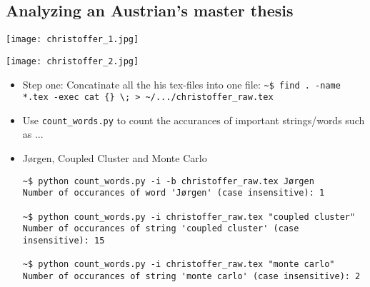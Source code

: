 \documentclass{beamer}
\begin{document}
\subsection{Analyzing an Austrian's master thesis}

\begin{frame}
\begin{center}
 \texttt{[image: christoffer\_1.jpg]}
\end{center}
\end{frame}

\begin{frame}
\begin{center}
 \texttt{[image: christoffer\_2.jpg]}
\end{center}
\end{frame}




\begin{frame}[containsverbatim]
\begin{itemize}
 \item Step one: Concatinate all the his tex-files into one file:  
 \vspace{0.2cm}
\scriptsize
\verb+~$ find . -name *.tex -exec cat {} \; > ~/.../christoffer_raw.tex+
\normalsize

 \item Use \verb+count_words.py+ to count the accurances of important strings/words such as ...

\end{itemize}
\end{frame}

\begin{frame}[containsverbatim]
\begin{itemize}

 \item Jørgen, Coupled Cluster and Monte Carlo
 \vspace{0.2cm}
\scriptsize
\begin{verbatim}
~$ python count_words.py -i -b christoffer_raw.tex Jørgen
Number of occurances of word 'Jørgen' (case insensitive): 1

~$ python count_words.py -i christoffer_raw.tex "coupled cluster"
Number of occurances of string 'coupled cluster' (case insensitive): 15

~$ python count_words.py -i christoffer_raw.tex "monte carlo"
Number of occurances of string 'monte carlo' (case insensitive): 2

\end{verbatim}
\normalsize
\end{itemize}
\end{frame}
\end{document}
